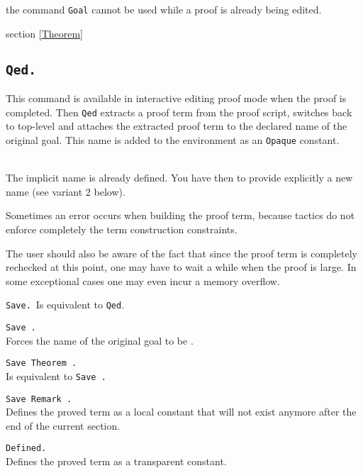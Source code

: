 \begin{ErrMsgs}
\item {}
\item {}
the command {\tt Goal} cannot be used while a proof is already being edited.
\end{ErrMsgs}

\SeeAlso section \ref{Theorem}

\subsection{\tt Qed.}\label{Qed}
This command is available in interactive editing proof mode when the
proof is completed.  Then {\tt Qed} extracts a proof term from the
proof script, switches back to {\Coq} top-level and attaches the
extracted proof term to the declared name of the original goal. This
name is added to the environment as an {\tt Opaque} constant.

\begin{ErrMsgs}
\item {}
\item \ident\ \\ 
  The implicit name is already defined. You have then to provide
  explicitly a new name (see variant 2 below).
\item Sometimes an error occurs when building the proof term,
because tactics do not enforce completely the term construction
constraints.

The user should also be aware of the fact that since the proof term is
completely rechecked at this point, one may have to wait a while when
the proof is large. In some exceptional cases one may even incur a
memory overflow.
\end{ErrMsgs}

\begin{Variants}
\item {\tt Save.}\
  Is equivalent to {\tt Qed}.
\item {\tt Save {\ident}.}\\
  Forces the name of the original goal to be {\ident}.
\item {\tt Save Theorem {\ident}.} \\
  Is equivalent to {\tt Save {\ident}.}
\item {\tt Save Remark {\ident}.}\\
  Defines the proved term as a local constant that will not exist
  anymore after the end of the current section.
\item {\tt Defined.} \label{Defined} \\
  Defines the proved term as a transparent constant.
\end{Variants}

